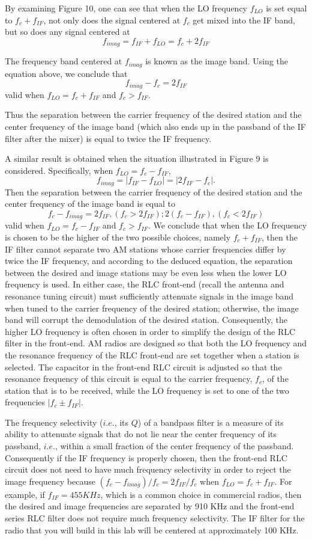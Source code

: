 \documentclass [utf8] {article}
\begin{document}
{	By examining Figure 10, one can see that when the LO frequency $f_{LO}$ is set equal to $f_c + f_{IF}$, not only does the signal centered at $f_c$ get mixed into the IF band, but so does any signal centered at
	$$f_{imag} = f_{IF} + f_{LO} = f_c + 2f_{IF}$$

	The frequency band centered at $f_{imag}$ is known as the image band. Using the equation above, we conclude that
	$$f_{imag}-f_c = 2f_{IF}$$
	valid when $f_{LO} = f_c + f_{IF}$ and $f_c >f_{IF}$.

	Thus the separation between the carrier frequency of the desired station and the center frequency of the image band (which also ends up in the passband of the IF filter after the mixer) is equal to twice the IF frequency.

	A similar result is obtained when the situation illustrated in Figure 9 is considered. Specifically, when $f_{LO} = f_c − f_{IF}$,
	$$f_{imag} = |f_{IF}-f_{LO}| = |2f_{IF}-f_c|.$$
	Then the separation between the carrier frequency of the desired station and the center frequency of the image band is equal to
	$$f_c -f_{imag} = 2f_{IF},(f_c>2f_{IF}); 2(f_c-f_{IF}),(f_c<2f_{IF})$$
	valid when $f_{LO} = f_c-f_{IF}$ and $f_c>f_{IF}$.
	We conclude that when the LO frequency is chosen to be the higher of the two possible choices, namely $f_c + f_{IF}$, then the IF filter cannot separate two AM stations whose carrier frequencies differ by twice the IF frequency, and according to the deduced equation, the separation between the desired and image stations may be even less when the lower LO frequency is used. In either case, the RLC front-end (recall the antenna and resonance tuning circuit) must sufficiently attenuate signals in the image band when tuned to the carrier frequency of the desired station; otherwise, the image band will corrupt the demodulation of the desired station. Consequently, the higher LO frequency is often chosen in order to simplify the design of the RLC filter in the front-end. AM radios are designed so that both the LO frequency and the resonance frequency of the RLC front-end are set together when a station is selected. The capacitor in the front-end RLC circuit is adjusted so that the resonance frequency of this circuit is equal to the carrier frequency, $f_c$, of the station that is to be received, while the LO frequency is set to one of the two frequencies $|f_c \pm f_{IF} |$.

	The frequency selectivity ($i.e.$, its $Q$) of a bandpass filter is a measure of its ability to attenuate signals that do not lie near the center frequency of its passband, $i.e.$, within a small fraction of the center frequency of the passband. Consequently if the IF frequency is properly chosen, then the front-end RLC circuit does not need to have much frequency selectivity in order to reject the image frequency because $(f_c-f_{imag})/f_c = 2f_{IF}/f_c$ when $f_{LO} = f_c + f_{IF}$. For example, if $f_{IF}= 455 KHz$, which is a common choice in commercial radios, then the desired and image frequencies are separated by 910 KHz and the front-end series RLC filter does not require much frequency selectivity. The IF filter for the radio that you will build in this lab will be centered at approximately 100 KHz.
}
\end{document}
